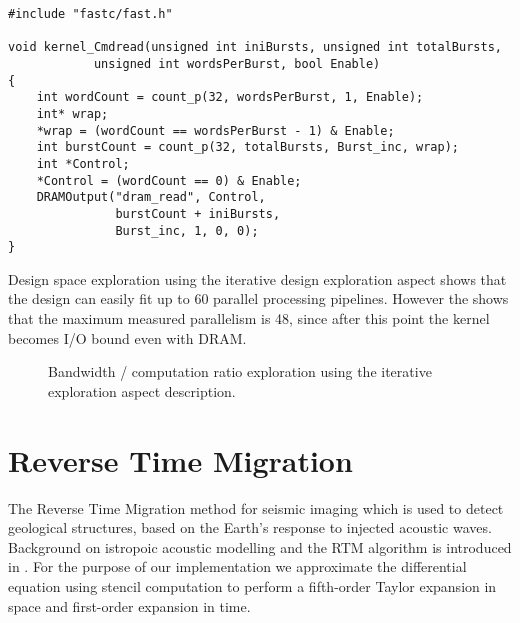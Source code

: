 \begin{lstlisting}[caption={\FAST{} Memory Controller Kernel}, label={mem-ctl}]
#include "fastc/fast.h"

void kernel_Cmdread(unsigned int iniBursts, unsigned int totalBursts,
		    unsigned int wordsPerBurst, bool Enable)
{
    int wordCount = count_p(32, wordsPerBurst, 1, Enable);
    int* wrap;
    *wrap = (wordCount == wordsPerBurst - 1) & Enable;
    int burstCount = count_p(32, totalBursts, Burst_inc, wrap);
    int *Control;
    *Control = (wordCount == 0) & Enable;
    DRAMOutput("dram_read", Control,
               burstCount + iniBursts,
               Burst_inc, 1, 0, 0);
}

\end{lstlisting}

 Design space exploration using the iterative design exploration
 aspect shows that the design can easily fit up to 60 parallel
 processing pipelines. However the  shows that
 the maximum measured parallelism is 48, since after this point the
 kernel becomes I/O bound even with DRAM.


\begin{figure}[!h]
  \centering
  \caption{Bandwidth / computation ratio exploration using the
    iterative exploration aspect description.}
  \label{fig:bscoles-exp}
\end{figure}




\section{Reverse Time Migration}
\label{sec:RTM}
The Reverse Time Migration method for seismic imaging which is used to
detect geological structures, based on the Earth's response to
injected acoustic waves. Background on istropoic acoustic modelling
and the RTM algorithm is introduced in . For the
purpose of our implementation we approximate the differential equation
using stencil computation to perform a fifth-order Taylor expansion in
space and first-order expansion in time.


